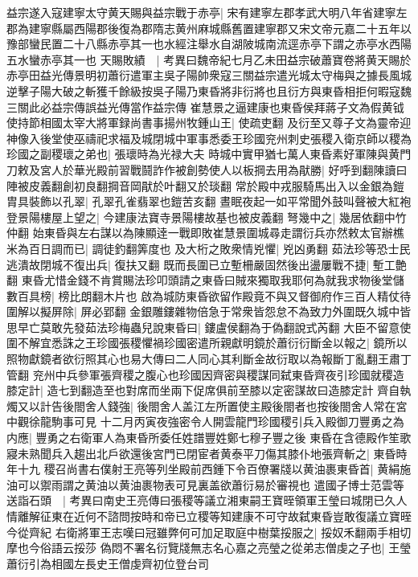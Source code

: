 益宗遂入寇建寧太守黄天賜與益宗戰于赤亭|{
	宋有建寧左郡孝武大明八年省建寧左郡為建寧縣屬西陽郡後復為郡隋志黄州麻城縣舊置建寧郡又宋文帝元嘉二十五年以豫部蠻民置二十八縣赤亭其一也水經注舉水自湖陂城南流逕赤亭下謂之赤亭水西陽五水蠻赤亭其一也}
天賜敗績　|{
	考異曰魏帝紀七月乙未田益宗破蕭寶卷將黄天賜於赤亭田益光傳景明初蕭衍遣軍主吳子陽帥衆寇三關益宗遣光城太守梅與之據長風城逆擊子陽大破之斬獲千餘級按吳子陽乃東昏將非衍將也且衍方與東昏相拒何暇寇魏三關此必益宗傳誤益光傳當作益宗傳}
崔慧景之逼建康也東昏侯拜蔣子文為假黄钺使持節相國太宰大將軍録尚書事揚州牧鍾山王|{
	使疏吏翻}
及衍至又尊子文為靈帝迎神像入後堂使巫禱祀求福及城閉城中軍事悉委王珍國兖州刺史張稷入衛京師以稷為珍國之副稷瓌之弟也|{
	張瓌時為光禄大夫}
時城中實甲猶七萬人東昏素好軍陳與黄門刀敕及宮人於華光殿前習戰鬪詐作被創勢使人以板掆去用為猒勝|{
	好呼到翻陳讀曰陣被皮義翻創初良翻掆音岡猒於叶翻又於琰翻}
常於殿中戎服騎馬出入以金銀為鎧胄具裝飾以孔翠|{
	孔翠孔雀翡翠也鎧苦亥翻}
晝眠夜起一如平常聞外鼓叫聲被大紅袍登景陽樓屋上望之|{
	今建康法寶寺景陽樓故基也被皮義翻}
弩幾中之|{
	幾居依翻中竹仲翻}
始東昏與左右謀以為陳顯逹一戰即敗崔慧景圍城尋走謂衍兵亦然敕太官辦樵米為百日調而已|{
	調徒釣翻筭度也}
及大桁之敗衆情兇懼|{
	兇凶勇翻}
茹法珍等恐士民逃潰故閉城不復出兵|{
	復扶又翻}
既而長圍已立塹柵嚴固然後出盪屢戰不捷|{
	塹工艶翻}
東昏尤惜金錢不肯賞賜法珍叩頭請之東昏曰賊來獨取我耶何為就我求物後堂儲數百具榜|{
	榜比朗翻木片也}
啟為城防東昏欲留作殿竟不與又督御府作三百人精仗待圍解以擬屏除|{
	屏必郢翻}
金銀雕鏤雜物倍急于常衆皆怨怠不為致力外圍既久城中皆思早亡莫敢先發茹法珍梅蟲兒說東昏曰|{
	鏤盧侯翻為于偽翻說式芮翻}
大臣不留意使圍不解宜悉誅之王珍國張稷懼禍珍國密遣所親獻明鏡於蕭衍衍斷金以報之|{
	鏡所以照物獻鏡者欲衍照其心也易大傳曰二人同心其利斷金故衍取以為報斷丁亂翻王肅丁管翻}
兖州中兵參軍張齊稷之腹心也珍國因齊密與稷謀同弑東昏齊夜引珍國就稷造膝定計|{
	造七到翻造至也對席而坐兩下促席俱前至膝以定密謀故曰造膝定計}
齊自執燭又以計告後閤舍人錢強|{
	後閤舍人盖江左所置使主殿後閤者也按後閤舍人常在宮中觀徐龍駒事可見}
十二月丙寅夜強密令人開雲龍門珍國稷引兵入殿御刀豐勇之為内應|{
	豐勇之右衛軍人為東昏所委任姓譜豐姓鄭七穆子豐之後}
東昏在含德殿作笙歌寢未熟聞兵入趨出北戶欲還後宮門已閉宦者黄泰平刀傷其膝仆地張齊斬之|{
	東昏時年十九}
稷召尚書右僕射王亮等列坐殿前西鍾下令百僚署牋以黄油裹東昏首|{
	黄絹施油可以禦雨謂之黄油以黄油裹物表可見裏盖欲蕭衍易於審視也}
遣國子博士范雲等送詣石頭　|{
	考異曰南史王亮傳曰張稷等議立湘東嗣王寶晊領軍王瑩曰城閉已久人情離解征東在近何不諮問按時和帝已立稷等知建康不可守故弑東昏豈敢復議立寶晊今從齊紀}
右衛將軍王志嘆曰冠雖弊何可加足取庭中樹葉挼服之|{
	挼奴禾翻兩手相切摩也今俗語云挼莎}
偽悶不署名衍覽牋無志名心嘉之亮瑩之從弟志僧虔之子也|{
	王瑩蕭衍引為相國左長史王僧虔齊初位登台司}
